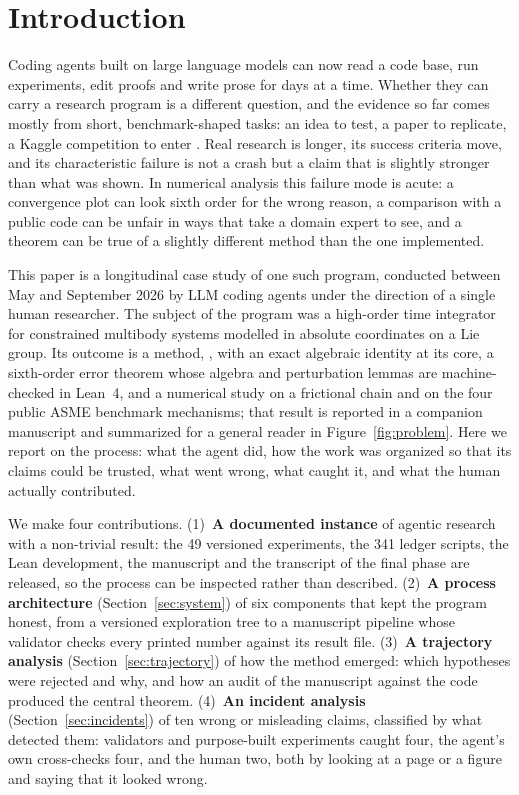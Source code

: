 \section{Introduction}
\label{sec:intro}

Coding agents built on large language models can now read a code base, run experiments, edit
proofs and write prose for days at a time. Whether they can carry a research program is a
different question, and the evidence so far comes mostly from short, benchmark-shaped tasks: an
idea to test, a paper to replicate, a Kaggle competition to enter
\citep{lu2024aiscientist,chan2025mlebench,starace2025paperbench}. Real research is longer, its
success criteria move, and its characteristic failure is not a crash but a claim that is slightly
stronger than what was shown. In numerical analysis this failure mode is acute: a convergence plot
can look sixth order for the wrong reason, a comparison with a public code can be unfair in ways
that take a domain expert to see, and a theorem can be true of a slightly different method than
the one implemented.

This paper is a longitudinal case study of one such program, conducted between May and September
2026 by LLM coding agents under the direction of a single human researcher. The subject of the
program was a high-order time integrator for constrained multibody systems modelled in absolute
coordinates on a Lie group. Its outcome is a method, \method{}, with an exact algebraic identity at
its core, a sixth-order error theorem whose algebra and perturbation lemmas are machine-checked in
Lean~4, and a numerical study on a frictional chain and on the four public ASME benchmark
mechanisms; that result is reported in a companion manuscript \citep{wang2026gauss6} and
summarized for a general reader in Figure~\ref{fig:problem}. Here we
report on the process: what the agent did, how the work was organized so that its claims could be
trusted, what went wrong, what caught it, and what the human actually contributed.

We make four contributions. (1)~\textbf{A documented instance} of agentic research with a
non-trivial result: the 49 versioned experiments, the 341 ledger scripts, the Lean development,
the manuscript and the transcript of the final phase are released, so the process can be inspected
rather than described. (2)~\textbf{A process architecture} (Section~\ref{sec:system}) of six
components that kept the program honest, from a versioned exploration tree to a manuscript
pipeline whose validator checks every printed number against its result file.
(3)~\textbf{A trajectory analysis} (Section~\ref{sec:trajectory}) of how the method emerged:
which hypotheses were rejected and why, and how an audit of the manuscript against the code
produced the central theorem. (4)~\textbf{An incident analysis} (Section~\ref{sec:incidents}) of
ten wrong or misleading claims, classified by what detected them: validators and purpose-built
experiments caught four, the agent's own cross-checks four, and the human two, both by looking at
a page or a figure and saying that it looked wrong.

